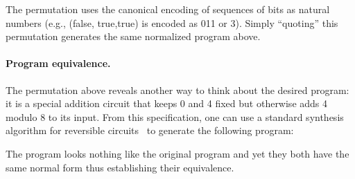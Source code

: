 \resetperm{}

\noindent The permutation uses the canonical encoding of sequences of bits as natural numbers (e.g., (\textsf{false},
\textsf{true},\textsf{true}) is encoded as 011 or 3).  Simply ``quoting'' this permutation generates the same normalized
program  above.

\paragraph*{Program equivalence.} The permutation above reveals another way to think about the desired program: it is a
special addition circuit that keeps 0 and 4 fixed but otherwise adds 4 modulo 8 to its input. From this specification,
one can use a standard synthesis algorithm for reversible circuits~\cite{10.1145/775832.775915} to generate the
following program:

\adder{}

\noindent The  program looks nothing like the original  program and yet they both have the
same normal form thus establishing their equivalence.




